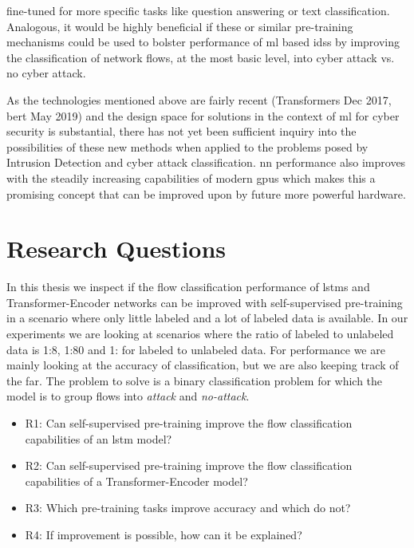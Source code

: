 fine-tuned for more specific tasks like question answering or text classification. Analogous, it would be highly beneficial if these or similar pre-training mechanisms could be used to bolster performance of \gls{ml} based \glspl{ids} by improving the classification of network flows, at the most basic level, into cyber attack vs. no cyber attack. \par
As the technologies mentioned above are fairly recent (Transformers Dec 2017, \gls{bert} May 2019) and the design space for solutions in the context of \gls{ml} for cyber security is substantial, there has not yet been sufficient inquiry into the possibilities of these new methods when applied to the problems posed by Intrusion Detection and cyber attack classification. \gls{nn} performance also improves with the steadily increasing capabilities of modern \glspl{gpu} which makes this a promising concept that can be improved upon by future more powerful hardware. 


\section{Research Questions} \label{sect.research_questions}

In this thesis we inspect if the flow classification performance of \glspl{lstm} and Transformer-Encoder networks can be improved with self-supervised pre-training in a scenario where only little labeled and a lot of labeled data is available. In our experiments we are looking at scenarios where the ratio of labeled to unlabeled data is 1:8, 1:80 and 1: for labeled to unlabeled data. For performance we are mainly looking at the accuracy of classification, but we are also keeping track of the \gls{far}. The problem to solve is a binary classification problem for which the model is to group flows into \textit{attack} and \textit{no-attack}. 

\begin{itemize}
	\item R1: Can self-supervised pre-training improve the flow classification capabilities of an \gls{lstm} model?
	\item R2: Can self-supervised pre-training improve the flow classification capabilities of a Transformer-Encoder model?
	\item R3: Which pre-training tasks improve accuracy and which do not?
	\item R4: If improvement is possible, how can it be explained?
\end{itemize}



